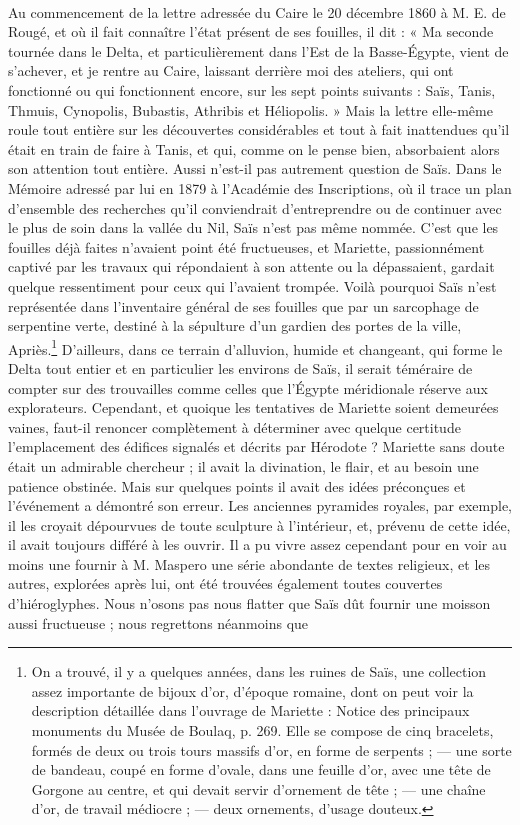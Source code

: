\documentclass[a4paper, 11pt, oneside]{article}
\begin{document}
\paragraph{}
Au commencement de la lettre adressée du Caire le 20 décembre 1860 à M. E. de Rougé, et où il fait connaître l'état présent de ses fouilles, il dit : « Ma seconde tournée dans le Delta, et particulièrement dans l'Est de la Basse-Égypte, vient de s'achever, et je rentre au Caire, laissant derrière moi des ateliers, qui ont fonctionné ou qui fonctionnent encore, sur les sept points suivants : Saïs, Tanis, Thmuis, Cynopolis, Bubastis, Athribis et Héliopolis. » Mais la lettre elle-même roule tout entière sur les découvertes considérables et tout à fait inattendues qu'il était en train de faire à Tanis, et qui, comme on le pense bien, absorbaient alors son attention tout entière. Aussi n'est-il pas autrement question de Saïs. Dans le Mémoire adressé par lui en 1879 à l'Académie des Inscriptions, où il trace un plan d'ensemble des recherches qu'il conviendrait d'entreprendre ou de continuer avec le plus de soin dans la vallée du Nil, Saïs n'est pas même nommée. C'est que les fouilles déjà faites n'avaient point été fructueuses, et Mariette, passionnément captivé par les travaux qui répondaient à son attente ou la dépassaient, gardait quelque ressentiment pour ceux qui l'avaient trompée. Voilà pourquoi Saïs n'est représentée dans l'inventaire général de ses fouilles que par un sarcophage de serpentine verte, destiné à la sépulture d'un gardien des portes de la ville, Apriès.\footnote{On a trouvé, il y a quelques années, dans les ruines de Saïs, une collection assez importante de bijoux d'or, d'époque romaine, dont on peut voir la description détaillée dans l'ouvrage de Mariette : Notice des principaux monuments du Musée de Boulaq, p. 269. Elle se compose de cinq bracelets, formés de deux ou trois tours massifs d'or, en forme de serpents ; --- une sorte de bandeau, coupé en forme d'ovale, dans une feuille d'or, avec une tête de Gorgone au centre, et qui devait servir d'ornement de tête ; --- une chaîne d'or, de travail médiocre ; --- deux ornements, d'usage douteux.} D'ailleurs, dans ce terrain d'alluvion, humide et changeant, qui forme le Delta tout entier et en particulier les environs de Saïs, il serait téméraire de compter sur des trouvailles comme celles que l'Égypte méridionale réserve aux explorateurs. Cependant, et quoique les tentatives de Mariette soient demeurées vaines, faut-il renoncer complètement à déterminer avec quelque certitude l'emplacement des édifices signalés et décrits par Hérodote ? Mariette sans doute était un admirable chercheur ; il avait la divination, le flair, et au besoin une patience obstinée. Mais sur quelques points il avait des idées préconçues et l'événement a démontré son erreur. Les anciennes pyramides royales, par exemple, il les croyait dépourvues de toute sculpture à l'intérieur, et, prévenu de cette idée, il avait toujours différé à les ouvrir. Il a pu vivre assez cependant pour en voir au moins une fournir à M. Maspero une série abondante de textes religieux, et les autres, explorées après lui, ont été trouvées également toutes couvertes d'hiéroglyphes. Nous n'osons pas nous flatter que Saïs dût fournir une moisson aussi fructueuse ; nous regrettons néanmoins que 
\end{document}
